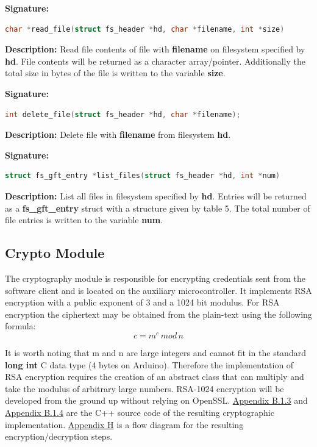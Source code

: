 \textbf{Signature: } 
\begin{lstlisting}[language=C]
char *read_file(struct fs_header *hd, char *filename, int *size)
\end{lstlisting}
\textbf{Description: }  \linebreak
Read file contents of file with \textbf{filename} on filesystem specified by \textbf{hd}. File contents will be returned as a character array/pointer. Additionally the total size in bytes of the file is written to the variable \textbf{size}.

\textbf{Signature: } 
\begin{lstlisting}[language=C]
int delete_file(struct fs_header *hd, char *filename);
\end{lstlisting}
\textbf{Description: }  \linebreak
Delete file with \textbf{filename} from filesystem \textbf{hd}.

\textbf{Signature: } 
\begin{lstlisting}[language=C]
struct fs_gft_entry *list_files(struct fs_header *hd, int *num)
\end{lstlisting}
\textbf{Description: }  \linebreak
List all files in filesystem specified by \textbf{hd}. Entries will be returned as a \textbf{fs\_gft\_entry} struct with a structure given by table 5. The total number of file entries is written to the variable \textbf{num}.

\subsection{Crypto Module}

The cryptography module is responsible for encrypting credentials sent from the software client and is located on the auxiliary microcontroller. It implements RSA encryption with a public exponent of 3 and a 1024 bit modulus. For RSA encryption the ciphertext may be obtained from the plain-text using the following formula:
\[ c = m^e\,mod\,n\]

It is worth noting that m and n are large integers and cannot fit in the standard \textbf{long int} C data type (4 bytes on Arduino). Therefore the implementation of RSA encryption requires the creation of an abstract class that can multiply and take the modulus of arbitrary large numbers. RSA-1024 encryption will be developed from the ground up without relying on OpenSSL. \hyperref[sec:rsah]{Appendix B.1.3} and \hyperref[sec:rsacpp]{Appendix B.1.4} are the C++ source code of the resulting cryptographic implementation. \hyperref[sec:eflow]{Appendix H} is a flow diagram for the resulting encryption/decryption steps.

